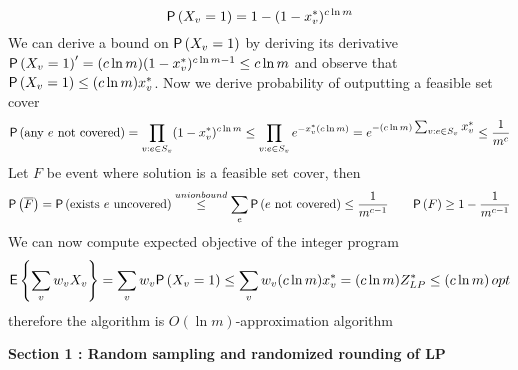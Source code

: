 \documentclass[11pt]{article}
\begin{document}
\begin{enumerate}
\[        \P{X_v=1} = 1 - (1 - x_v^*)^{c\ln m} 
    \]
    We can derive a bound on $\P{X_v=1}$ by deriving its derivative $\P{X_v=1}' = (c\ln m)(1-x_v^*)^{c\ln m - 1} \leq c\ln m$ and observe that $\P{X_v=1} \leq (c\ln m)x_v^*$. Now we derive probability of outputting a feasible set cover
    \[
        \P{\text{any $e$ not covered}} 
        = \prod_{v:e\in S_v} (1 - x_v^*)^{c\ln m} 
        \leq \prod_{v:e\in S_v} e^{-x_v^* (c\ln m)}
        = e^{-(c\ln m) \textstyle\sum_{v:e\in S_v} x_v^*} 
        \leq \frac{1}{m^c}
    \]
    Let $F$ be event where solution is a feasible set cover, then 
    \[
        \P{\overline{F}} 
        = \P{\text{exists $e$ uncovered}}
        \overset{unionbound}{\leq} \sum_e \P{\text{$e$ not covered}}
        \leq \frac{1}{m^{c-1}}
        \qquad 
        \P{F} \geq 1 - \frac{1}{m^{c-1}}
    \]
    We can now compute expected objective of the integer program 
    \[
        \E{\sum_{v} w_v X_v} 
        = \sum_v w_v \P{X_v = 1} 
        \leq \sum_v w_v (c\ln m)x_v^* 
        = (c\ln m) Z_{LP}^*
        \leq (c\ln m) \, opt
    \]
    therefore the algorithm is $O(\ln m)$-approximation algorithm
\end{enumerate}


\textbf{Section 1 : Random sampling and randomized rounding of LP}
\end{document}
